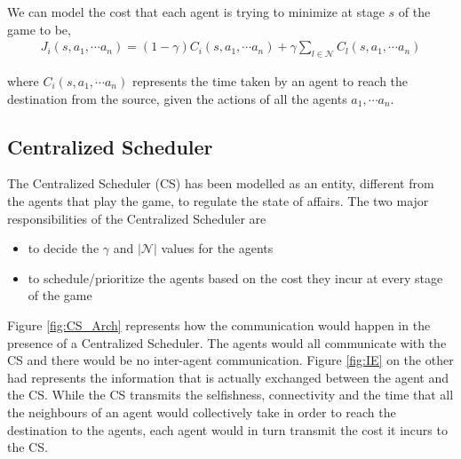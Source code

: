 \documentclass[11pt, letterpaper]{article}
\begin{document}
We can model the cost that each agent is trying to minimize at stage $s$ of the game to be,
\begin{align}
    J_i(s,a_1, \cdots a_n) =(1-\gamma) C_i(s,a_1, \cdots a_n) +  \gamma\sum\limits_{l \in \mathcal{N}}C_l(s,a_1, \cdots a_n)
\end{align}

where $C_i(s,a_1, \cdots a_n)$ represents the time taken by an agent to reach the destination from the source, given the actions of all the agents $a_1, \cdots a_n$.

\subsection{Centralized Scheduler}
The Centralized Scheduler (CS) has been modelled as an entity, different from the agents that play the game, to regulate the state of affairs. The two major responsibilities of the Centralized Scheduler are
\begin{itemize}
    \item to decide the $\gamma$ and $|\mathcal{N}|$ values for the agents
    \item to schedule/prioritize the agents based on the cost they incur at every stage of the game
\end{itemize}

Figure \ref{fig:CS_Arch} represents how the communication would happen in the presence of a Centralized Scheduler. The agents would all communicate with the CS and there would be no inter-agent communication. Figure \ref{fig:IE} on the other had represents the information that is actually exchanged between the agent and the CS. While the CS transmits the selfishness, connectivity and the time that all the neighbours of an agent would collectively take in order to reach the destination to the agents, each agent would in turn transmit the cost it incurs to the CS. 
\end{document}
